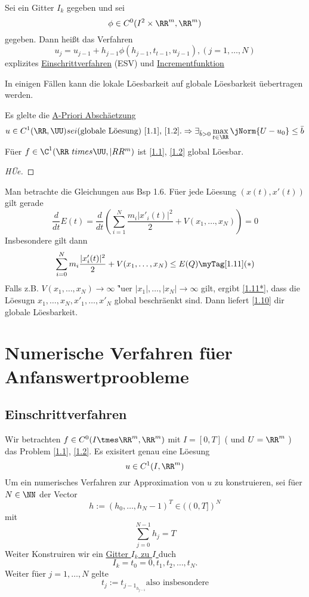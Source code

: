 \begin{Def}
  Sei ein Gitter $I_k$ gegeben und sei \[
    \phi \in C^0(I^2\times \RR^m,\RR^m) \]
  gegeben. Dann hei\ss t das Verfahren \[
    u_j = u_{j-1} + h_{j-1} \phi (h_{j-1},t_{t-1},u_{j-1}), (j = 1,\dotsc,N) \]
    explizites \uline{Einschrittverfahren} (ESV) und \phi
    \uline{Incrementfunktion}
\end{Def}


In einigen F\"allen kann die lokale L\"oesbarkeit auf globale L\"oesbarkeit
\"uebertragen werden.

\begin{Kor} \label{1.10}
  Es glelte die \uline{A-Priori Absch\"aetzung} \[ u \in C^1(\RR,\UU) sei 
  \text{(globale L\"oesung) \eqref{1.1}, \eqref{1.2}.} \\ 
  \Rightarrow \exists_{\bar{b} > 0} \max_{\substack t \in \RR} \jNorm{U - u_0}
  \leq \bar{b} \]
  F\"uer \( f \in \C^1(\RR\ times \UU, |RR^m) \) ist \eqref{1.1}, \eqref{1.2}
  global L\"oesbar.
\end{Kor}
\begin{proof} [H\"Ue] \myQEDEnd 
\end{proof}
\begin{Bsp}
  Man betrachte die Gleichungen aus Bsp 1.6. F\"uer jede L\"oesung \( (x(t),
  x'(t)) \) gilt gerade \[ \dfrac{d}{dt} E(t) = \dfrac{d}{dt}(\sum_{i=1}^N
  \frac{m_i | x'_i (t)|^2}{2} + V(x_1,\dotsc,x_N)) = 0 \] Insbesondere gilt dann
  \[ \sum_{i=0}^N m_i \frac{|x'_i(t)|^2}{2} + V(x_1,\dotsc,x_N) \leq E(Q)
  \myTag[1.11](*) \]
  Falls z.B. \( V(x_1,\dotsc,x_N) \rightarrow \infty \) \f"uer \( |x_1|,\dotsc,|x_N|
  \rightarrow \infty \) gilt, ergibt \eqref{1.11*}, dass die L\"oesugn \( x_1,
  \dotsc, x_N, x'_1, \dotsc, x'_N \) global beschr\"aenkt sind. Dann liefert
  \ref{1.10} dir globale L\"oesbarkeit.
  \myQEDEnd
\end{Bsp}

\chapter{Numerische Verfahren f\"uer Anfanswertproobleme}

\section{Einschrittverfahren}

Wir betrachten \Fuer \( f\in C^0(I\tmes \RR^m, \RR^m) \) mit \( I = [0,T] \) (
und \( U = \RR^m \) ) das Problem \eqref{1.1}, \eqref{1.2}. Es exisitert genau
eine L\"oesung \[ u \in C^1(I, \RR^m) \]
Um ein numerisches Verfahren zur Approximation von \( u \) zu konstruieren, sei
f\"uer \( N \in \NN \) der Vector \[ h:= (h_0,\dotsc,h_N-1)^T \in ((0,T])^N \]
mit \[ \sum_{j=0}^{N-1}h_j=T  \]
Weiter Konstruiren wir ein \uline{Gitter \( I_k \) zu \( I \) } duch \[
  I_k = {t_0 = 0, t_1, t_2, \dotsc, t_N}. \]
Weiter f\"uer \( j= 1,\dotsc,N \) gelte \[t_j := t_{j-1} _ h_{j-1} \text{also
insbesondere} \] 

